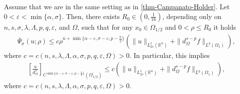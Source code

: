 \documentclass[11pt,reqno]{amsart}
\theoremstyle{plain}
\theoremstyle{definition}
\numberwithin{equation}{section}
\newcommand{\R}{\mathbb{R}}
\newcommand{\1}{\mathbbm{1}}
\begin{document}
\begin{lemma}
\label{lemma:Campanato-almost-optimal-Holder}
Assume that we are in the same setting as in \autoref{thm-Campanato-Holder}. Let $0<\varepsilon<\min\{\alpha, \sigma\}$. Then, there exists $R_0 \in (0,\frac{1}{16})$, depending only on $n,s,\sigma,\lambda,\Lambda,p,q,\varepsilon$, and $\Omega$, such that for any $x_0 \in \Omega_{1/2}$ and $0 < \rho \leq R_0$ it holds
\begin{align}
\label{eq-Campanato-almost-optimal-Holder}
\overline{\Psi}_\sigma(u;\rho) \le c \rho^{n+\min\{\alpha-\varepsilon,\sigma-\varepsilon, p - \frac{n}{q}\}} \left( \|u\|_{L^1_{2s}(\R^n)} + \| d^{s-p}_{\Omega} f\|_{L^q(\Omega_1)} \right),
\end{align}
where $c = c(n, s, \lambda, \Lambda, \alpha, \sigma, p, q, \varepsilon, \Omega) > 0$. In particular, this implies
\begin{align}
\label{eq-Campanato-almost-optimal-Holder2}
\left[ \frac{u}{d_\Omega^s} \right]_{C^{\min\{\alpha-\varepsilon,\sigma-\varepsilon,p-\frac{n}{q}\}}(\overline{\Omega_{1/2}})} \leq c \left( \|u\|_{L^1_{2s}(\R^n)} + \|d^{s-p}_{\Omega} f\|_{L^q(\Omega_1)} \right),
\end{align}
where $c=c(n, s, \lambda, \Lambda, \alpha, \sigma, p, q, \varepsilon, \Omega) > 0$.
\end{lemma}
\end{document}
